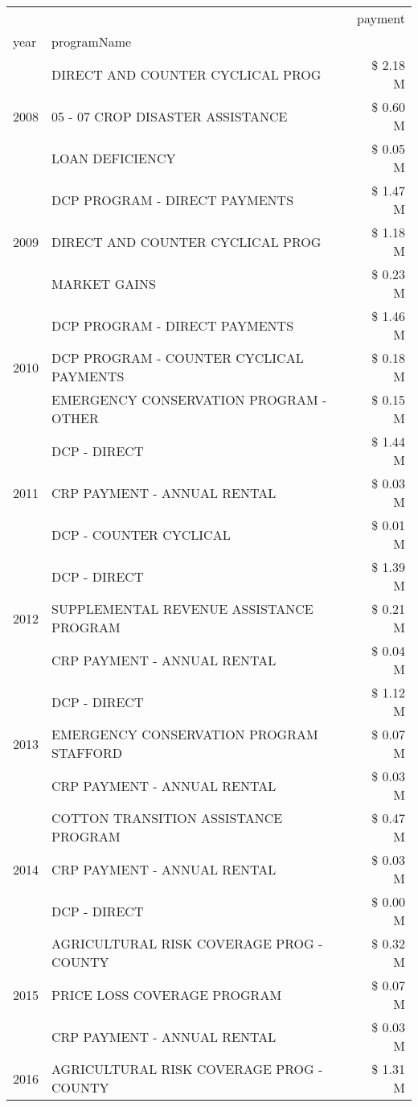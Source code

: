 \begin{tabular}{llr}
\toprule
 &  & payment \\
year & programName &  \\
\midrule
\multirow[t]{3}{*}{2008} & DIRECT AND COUNTER CYCLICAL PROG & \$ 2.18 M \\
 & 05 - 07 CROP DISASTER ASSISTANCE & \$ 0.60 M \\
 & LOAN DEFICIENCY & \$ 0.05 M \\
\cline{1-3}
\multirow[t]{3}{*}{2009} & DCP PROGRAM - DIRECT PAYMENTS & \$ 1.47 M \\
 & DIRECT AND COUNTER CYCLICAL PROG & \$ 1.18 M \\
 & MARKET GAINS & \$ 0.23 M \\
\cline{1-3}
\multirow[t]{3}{*}{2010} & DCP PROGRAM - DIRECT PAYMENTS & \$ 1.46 M \\
 & DCP PROGRAM - COUNTER CYCLICAL PAYMENTS & \$ 0.18 M \\
 & EMERGENCY CONSERVATION PROGRAM - OTHER & \$ 0.15 M \\
\cline{1-3}
\multirow[t]{3}{*}{2011} & DCP - DIRECT & \$ 1.44 M \\
 & CRP PAYMENT - ANNUAL RENTAL & \$ 0.03 M \\
 & DCP - COUNTER CYCLICAL & \$ 0.01 M \\
\cline{1-3}
\multirow[t]{3}{*}{2012} & DCP - DIRECT & \$ 1.39 M \\
 & SUPPLEMENTAL REVENUE ASSISTANCE PROGRAM & \$ 0.21 M \\
 & CRP PAYMENT - ANNUAL RENTAL & \$ 0.04 M \\
\cline{1-3}
\multirow[t]{3}{*}{2013} & DCP - DIRECT & \$ 1.12 M \\
 & EMERGENCY CONSERVATION PROGRAM STAFFORD & \$ 0.07 M \\
 & CRP PAYMENT - ANNUAL RENTAL & \$ 0.03 M \\
\cline{1-3}
\multirow[t]{3}{*}{2014} & COTTON TRANSITION ASSISTANCE PROGRAM & \$ 0.47 M \\
 & CRP PAYMENT - ANNUAL RENTAL & \$ 0.03 M \\
 & DCP - DIRECT & \$ 0.00 M \\
\cline{1-3}
\multirow[t]{3}{*}{2015} & AGRICULTURAL RISK COVERAGE PROG - COUNTY & \$ 0.32 M \\
 & PRICE LOSS COVERAGE PROGRAM & \$ 0.07 M \\
 & CRP PAYMENT - ANNUAL RENTAL & \$ 0.03 M \\
\cline{1-3}
\multirow[t]{3}{*}{2016} & AGRICULTURAL RISK COVERAGE PROG - COUNTY & \$ 1.31 M \\

\end{tabular}
